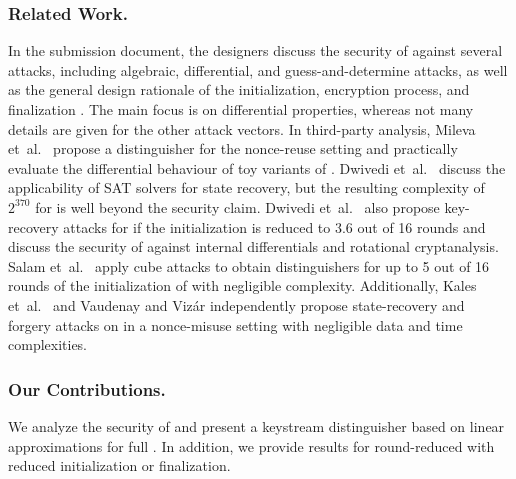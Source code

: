 \subsubsection*{Related Work.}
In the submission document, the designers discuss the security of \morus against
several attacks, including algebraic, differential, and guess-and-determine attacks,
as well as the general design rationale of the initialization, encryption process, and finalization \cite{MORUS}.
The main focus is on differential properties, whereas not many details are given for the other attack vectors.
In third-party analysis,
Mileva et~al.~\cite{balkancryptsecMilevaDV15} propose a distinguisher for the nonce-reuse setting and practically evaluate the differential behaviour of toy variants of \morus.
Dwivedi et~al.~\cite{cryptoeprint:2016:1053} discuss the applicability of SAT solvers for state recovery, but the resulting complexity of $2^{370}$ for \morus[640] is well beyond the security claim.
Dwivedi et~al.~\cite{secryptDwivediMW17} also propose key-recovery attacks for \morus[1280] if the initialization is reduced to 3.6 out of 16 rounds and discuss the security of \morus against internal differentials and rotational cryptanalysis.
Salam et~al.~\cite{trustcomSalamSBDPW17} apply cube attacks to obtain distinguishers for up to 5 out of 16 rounds of the initialization of \morus[1280] with negligible complexity.
Additionally, 
Kales et~al.~\cite{cryptoeprint:2017:1137} and
Vaudenay and Viz\'{a}r \cite{cryptoeprint:2017:1147}
independently propose state-recovery and forgery attacks on \morus in a nonce-misuse setting with negligible data and time complexities.


\subsubsection*{Our Contributions.}
We analyze the security of \morus and present a keystream distinguisher based on
linear approximations for full \morus[1280].
In addition, we provide results for round-reduced \morus with reduced initialization or finalization.

